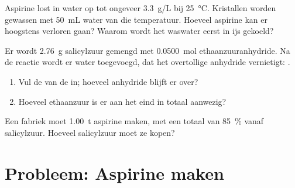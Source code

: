 \begin{exercise}[$\star\star\star$]\label{exo:g10:synthesis-yield:13}
Aspirine lost in water op tot ongeveer \qty{3.3}{g/L} bij
\qty{25}{\celsius}. Kristallen worden gewassen met \qty{50}{mL} water van
die temperatuur. Hoeveel aspirine kan er hoogstens verloren gaan? Waarom
wordt het waswater eerst in ijs gekoeld?
\end{exercise}

\begin{exercise}[$\star\star\star$]\label{exo:g10:synthesis-yield:14}
Er wordt \qty{2.76}{g} salicylzuur gemengd met \qty{0.0500}{mol}
ethaanzuuranhydride. Na de reactie wordt er water toegevoegd, dat het
overtollige anhydride vernietigt: .
\begin{enumerate}
  \item Vul de  van de  in; hoeveel anhydride
        blijft er over?
  \item Hoeveel ethaanzuur is er aan het eind in totaal aanwezig?
\end{enumerate}
\end{exercise}

\begin{exercise}[$\star\star\star$]\label{exo:g10:synthesis-yield:15}
Een fabriek moet \qty{1.00}{t} aspirine maken, met een totaal 
van \qty{85}{\percent} vanaf salicylzuur. Hoeveel salicylzuur moet ze
kopen?
\end{exercise}

\section{Probleem: Aspirine maken}

